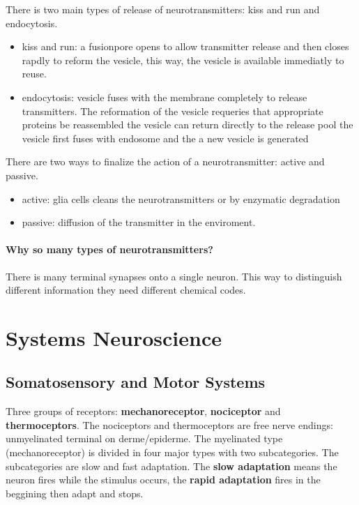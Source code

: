 \documentclass[12pt,article,oneside,a4paper]{memoir}
\begin{document}
There is two main types of release of neurotransmitters: kiss and run and endocytosis.
\begin{itemize}
\item kiss and run: a fusionpore opens to allow transmitter release and then closes rapdly to reform the vesicle, this way, the vesicle is available immediatly to reuse.
\item endocytosis: vesicle fuses with the membrane completely to release transmitters. The reformation of the vesicle requeries that appropriate proteins be reassembled
\subitem the vesicle can return directly to the release pool
\subitem the vesicle first fuses with endosome and the a new vesicle is generated
\end{itemize}

There are two ways to finalize the action of a neurotransmitter: active and passive.
\begin{itemize}
\item active: glia cells cleans the neurotransmitters or by enzymatic degradation
\item passive: diffusion of the transmitter in the enviroment.
\end{itemize}

\paragraph{Why so many types of neurotransmitters?} There is many terminal synapses onto a single neuron. This way to distinguish different information they need different chemical codes.


\section{Systems Neuroscience}
\subsection{Somatosensory and Motor Systems}

Three groups of receptors: \textbf{mechanoreceptor}, \textbf{nociceptor} and \textbf{thermoceptors}.
The nociceptors and thermoceptors are free nerve endings: unmyelinated terminal on derme/epiderme.
The myelinated type (mechanoreceptor) is divided in four major types with two subcategories. The subcategories are slow and fast adaptation. The \textbf{slow adaptation} means the neuron fires while the stimulus occurs, the \textbf{rapid adaptation} fires in the beggining then adapt and stops.
\end{document}
